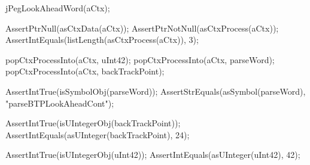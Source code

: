  jPegLookAheadWord(aCtx);
  
  AssertPtrNull(asCtxData(aCtx));
  AssertPtrNotNull(asCtxProcess(aCtx));
  AssertIntEquals(listLength(asCtxProcess(aCtx)), 3);
  
  popCtxProcessInto(aCtx, uInt42);
  popCtxProcessInto(aCtx, parseWord);
  popCtxProcessInto(aCtx, backTrackPoint);
  
  AssertIntTrue(isSymbolObj(parseWord));
  AssertStrEquals(asSymbol(parseWord), "parseBTPLookAheadCont");
  
  AssertIntTrue(isUIntegerObj(backTrackPoint));
  AssertIntEquals(asUInteger(backTrackPoint), 24);
  
  AssertIntTrue(isUIntegerObj(uInt42));
  AssertIntEquals(asUInteger(uInt42), 42);
\stopCTest
\stopTestCase
\stopTestSuite
